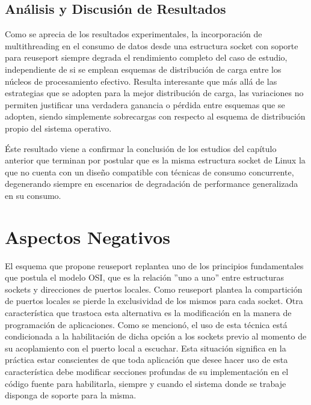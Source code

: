\subsection{Análisis y Discusión de Resultados}
Como se aprecia de los resultados experimentales, la incorporación de multithreading en el consumo de datos desde una estructura socket con soporte para reuseport siempre degrada el rendimiento completo del caso de estudio, independiente de si se emplean esquemas de distribución de carga entre los núcleos de procesamiento efectivo. Resulta interesante que más allá de las estrategias que se adopten para la mejor distribución de carga, las variaciones no permiten justificar una verdadera ganancia o pérdida entre esquemas que se adopten, siendo simplemente sobrecargas con respecto al esquema de distribución propio del sistema operativo.

Éste resultado viene a confirmar la conclusión de los estudios del capítulo anterior que terminan por postular que es la misma estructura socket de Linux la que no cuenta con un diseño compatible con técnicas de consumo concurrente, degenerando siempre en escenarios de degradación de performance generalizada en su consumo.

\section{Aspectos Negativos}
El esquema que propone reuseport replantea uno de los principios fundamentales que postula el modelo OSI, que es la relación ''uno a uno'' entre estructuras sockets y direcciones de puertos locales. Como reuseport plantea la compartición de puertos locales se pierde la exclusividad de los mismos para cada socket. Otra característica que trastoca esta alternativa es la modificación en la manera de programación de aplicaciones. Como se mencionó, el uso de esta técnica está condicionada a la habilitación de dicha opción a los sockets previo al momento de su acoplamiento con el puerto local a escuchar. Esta situación significa en la práctica estar conscientes de que toda aplicación que desee hacer uso de esta característica debe modificar secciones profundas de su implementación en el código fuente para habilitarla, siempre y cuando el sistema donde se trabaje disponga de soporte para la misma.

